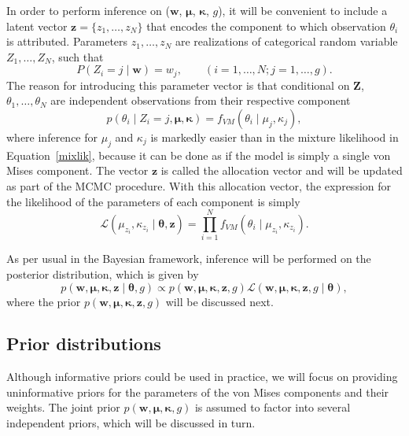 In order to perform inference on ($\bm w$, $\bm\mu$, $\bm\kappa$, $g$), it will be convenient to include a latent vector $\bm z = \{z_1, \dotsc, z_N\}$ that encodes the component to which observation $\theta_i$ is attributed. Parameters $z_1, \dotsc, z_N$ are realizations of categorical random variable $Z_1, \dotsc, Z_N$, such that
\begin{equation}
P(Z_i = j \mid \bm{w}) = w_j, \qquad (i=1,\dotsc,N; j=1,\dotsc,g).
\end{equation}
The reason for introducing this parameter vector is that conditional on $\bm Z$, $\theta_1, \dotsc, \theta_N$ are independent observations from their respective component
\begin{equation}
p(\theta_i \mid Z_i = j, \bm \mu, \bm \kappa) = f_{VM}(\theta_i \mid \mu_j, \kappa_j),
\end{equation}
where inference for $\mu_j$ and $\kappa_j$ is markedly easier than in the mixture likelihood in Equation~\ref{mixlik}, because it can be done as if the model is simply a single von Mises component. The vector $\bm z$ is called the allocation vector and will be updated as part of the MCMC procedure. With this allocation vector, the expression for the likelihood of the parameters of each component is simply
\begin{equation}
\mathcal{L}(\mu_{z_i},\kappa_{z_i} \mid\bm\theta,\bm{z}) = \prod_{i=1}^N f_{VM}(\theta_i\mid\mu_{z_i},\kappa_{z_i}).
\end{equation}

As per usual in the Bayesian framework, inference will be performed on the posterior distribution, which is given by
\begin{equation} \label{posterior}
p(\bm{w},\bm\mu,\bm\kappa,\bm{z}\mid\bm\theta,g) \propto p(\bm{w},\bm\mu,\bm\kappa,\bm{z},g) \mathcal{L}(\bm{w},\bm\mu,\bm\kappa,\bm{z},g\mid\bm\theta), 
\end{equation}
where the prior $p(\bm{w},\bm\mu,\bm\kappa,\bm{z}, g)$ will be discussed next.  

\subsection{Prior distributions} \label{prior-distributions}

Although informative priors could be used in practice, we will focus on providing uninformative priors for the parameters of the von Mises components and their weights. The joint prior $p(\bm{w},\bm\mu,\bm\kappa,g)$ is assumed to factor into several independent priors, which will be discussed in turn. 

